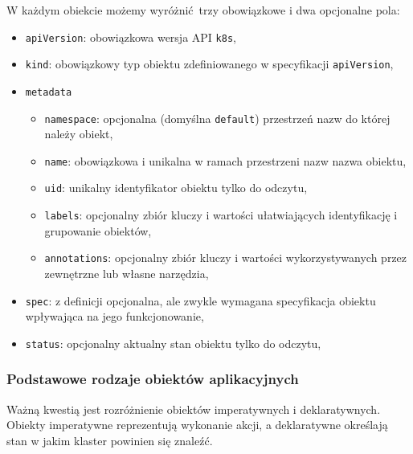 \documentclass[a4paper,12pt,twoside,openany]{report}
\providecommand{\tightlist}{%
  \setlength{\itemsep}{0pt}\setlength{\parskip}{0pt}}
\newcommand{\passthrough}[1]{#1}
\begin{document}
W każdym obiekcie możemy wyróżnić~trzy obowiązkowe i dwa opcjonalne
pola:

\begin{itemize}
\tightlist
\item
  \passthrough{\lstinline!apiVersion!}: obowiązkowa wersja API
  \passthrough{\lstinline!k8s!},
\item
  \passthrough{\lstinline!kind!}: obowiązkowy typ obiektu zdefiniowanego
  w specyfikacji \passthrough{\lstinline!apiVersion!},
\item
  \passthrough{\lstinline!metadata!}

  \begin{itemize}
  \tightlist
  \item
    \passthrough{\lstinline!namespace!}: opcjonalna (domyślna
    \passthrough{\lstinline!default!}) przestrzeń nazw do której należy
    obiekt,
  \item
    \passthrough{\lstinline!name!}: obowiązkowa i unikalna w ramach
    przestrzeni nazw nazwa obiektu,
  \item
    \passthrough{\lstinline!uid!}: unikalny identyfikator obiektu tylko
    do odczytu,
  \item
    \passthrough{\lstinline!labels!}: opcjonalny zbiór kluczy i wartości
    ułatwiających identyfikację i grupowanie obiektów,
  \item
    \passthrough{\lstinline!annotations!}: opcjonalny zbiór kluczy i
    wartości wykorzystywanych przez zewnętrzne lub własne narzędzia,\\
  \end{itemize}
\item
  \passthrough{\lstinline!spec!}: z definicji opcjonalna, ale zwykle
  wymagana specyfikacja obiektu wpływająca na jego funkcjonowanie,
\item
  \passthrough{\lstinline!status!}: opcjonalny aktualny stan obiektu
  tylko do odczytu,
\end{itemize}

\hypertarget{podstawowe-rodzaje-obiektuxf3w-aplikacyjnych}{%
\subsubsection{Podstawowe rodzaje obiektów
aplikacyjnych}\label{podstawowe-rodzaje-obiektuxf3w-aplikacyjnych}}

Ważną kwestią jest rozróżnienie obiektów imperatywnych i deklaratywnych.
Obiekty imperatywne reprezentują wykonanie akcji, a deklaratywne
określają stan w jakim klaster powinien się znaleźć.
\end{document}
